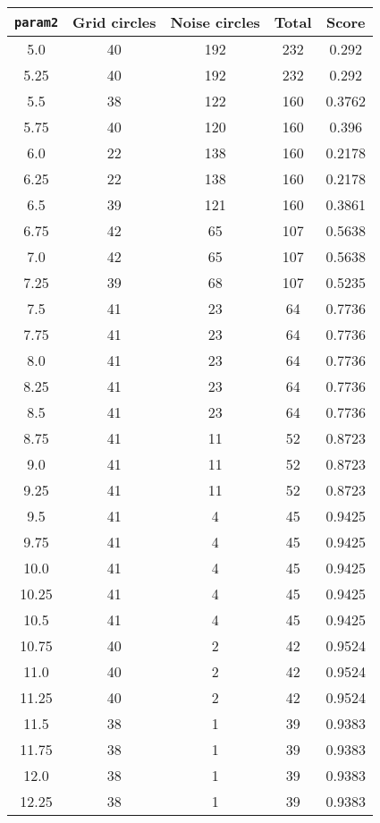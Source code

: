 \documentclass[letterpaper, 12pt]{article}
\begin{document}
\begin{longtable}{|c|c|c|c|c|}
\hline
\textbf{\texttt{param2}} & \textbf{Grid circles} & \textbf{Noise circles} & \textbf{Total} & \textbf{Score} \\
\hline
5.0 & 40 & 192 & 232 & 0.292 \\
\hline
5.25 & 40 & 192 & 232 & 0.292 \\
\hline
5.5 & 38 & 122 & 160 & 0.3762 \\
\hline
5.75 & 40 & 120 & 160 & 0.396 \\
\hline
6.0 & 22 & 138 & 160 & 0.2178 \\
\hline
6.25 & 22 & 138 & 160 & 0.2178 \\
\hline
6.5 & 39 & 121 & 160 & 0.3861 \\
\hline
6.75 & 42 & 65 & 107 & 0.5638 \\
\hline
7.0 & 42 & 65 & 107 & 0.5638 \\
\hline
7.25 & 39 & 68 & 107 & 0.5235 \\
\hline
7.5 & 41 & 23 & 64 & 0.7736 \\
\hline
7.75 & 41 & 23 & 64 & 0.7736 \\
\hline
8.0 & 41 & 23 & 64 & 0.7736 \\
\hline
8.25 & 41 & 23 & 64 & 0.7736 \\
\hline
8.5 & 41 & 23 & 64 & 0.7736 \\
\hline
8.75 & 41 & 11 & 52 & 0.8723 \\
\hline
9.0 & 41 & 11 & 52 & 0.8723 \\
\hline
9.25 & 41 & 11 & 52 & 0.8723 \\
\hline
9.5 & 41 & 4 & 45 & 0.9425 \\
\hline
9.75 & 41 & 4 & 45 & 0.9425 \\
\hline
10.0 & 41 & 4 & 45 & 0.9425 \\
\hline
10.25 & 41 & 4 & 45 & 0.9425 \\
\hline
10.5 & 41 & 4 & 45 & 0.9425 \\
\hline
10.75 & 40 & 2 & 42 & 0.9524 \\
\hline
11.0 & 40 & 2 & 42 & 0.9524 \\
\hline
11.25 & 40 & 2 & 42 & 0.9524 \\
\hline
11.5 & 38 & 1 & 39 & 0.9383 \\
\hline
11.75 & 38 & 1 & 39 & 0.9383 \\
\hline
12.0 & 38 & 1 & 39 & 0.9383 \\
\hline
12.25 & 38 & 1 & 39 & 0.9383 \\
\hline

\end{longtable}
\end{document}
